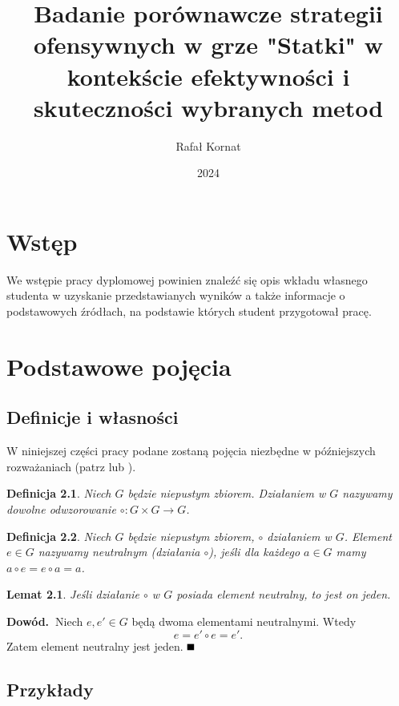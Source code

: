 \documentclass[magisterska]{pracadypl}
\author{Rafał Kornat}
\title{Badanie porównawcze strategii ofensywnych w grze "Statki" w kontekście efektywności i skuteczności wybranych metod}
\date{2024}
\def\pd{\noindent \textbf{Dowód.~}} %
\def\kd{\hfill\mbox{$\rule{2mm}{2mm}$}} %
\newtheorem{defi}{Definicja}[section]
\newtheorem{lem}{Lemat}[section]
\begin{document}
\maketitle
\tableofcontents
\newpage



\chapter{Wstęp}

We wstępie pracy dyplomowej powinien znaleźć się opis wkładu własnego studenta w uzyskanie przedstawianych wyników a także informacje o podstawowych źródłach, na podstawie których student przygotował pracę.


\chapter{Podstawowe pojęcia}

\section{Definicje i własności}

W niniejszej części pracy podane zostaną pojęcia niezbędne w późniejszych rozważaniach (patrz \cite{Kostrykin} lub \cite{Lang}).
\begin{defi}
Niech $G$ będzie niepustym zbiorem. Działaniem w $G$ nazywamy dowolne odwzorowanie $\circ:G\times G\to G$.
\end{defi}

\begin{defi}
Niech $G$ będzie niepustym zbiorem, $\circ$ działaniem w $G$. Element $e\in G$ nazywamy neutralnym (działania $\circ$), jeśli dla każdego $a\in G$ mamy $a\circ e=e\circ a=a$.
\end{defi}

\begin{lem}\label{lem:element_neutralny}
Jeśli działanie $\circ$ w $G$ posiada element neutralny, to jest on jeden.
\end{lem}
\pd Niech $e,e'\in G$ będą dwoma elementami neutralnymi. Wtedy
\begin{equation}\label{eq:element_neutralny}
e=e'\circ e=e'.
\end{equation}
Zatem element neutralny jest jeden. \kd


\section{Przykłady}
\end{document}
